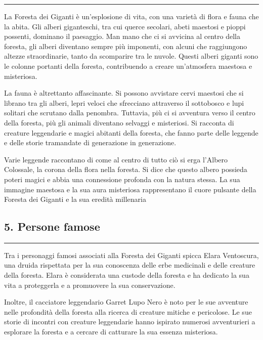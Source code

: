 \begin{center}\rule{0.5\linewidth}{0.5pt}\end{center}

La Foresta dei Giganti è un'esplosione di vita, con una varietà di flora
e fauna che la abita. Gli alberi giganteschi, tra cui querce secolari,
abeti maestosi e pioppi possenti, dominano il paesaggio. Man mano che ci
si avvicina al centro della foresta, gli alberi diventano sempre più
imponenti, con alcuni che raggiungono altezze straordinarie, tanto da
scomparire tra le nuvole. Questi alberi giganti sono le colonne portanti
della foresta, contribuendo a creare un'atmosfera maestosa e misteriosa.

La fauna è altrettanto affascinante. Si possono avvistare cervi maestosi
che si librano tra gli alberi, lepri veloci che sfrecciano attraverso il
sottobosco e lupi solitari che scrutano dalla penombra. Tuttavia, più ci
si avventura verso il centro della foresta, più gli animali diventano
selvaggi e misteriosi. Si racconta di creature leggendarie e magici
abitanti della foresta, che fanno parte delle leggende e delle storie
tramandate di generazione in generazione.

Varie leggende raccontano di come al centro di tutto ciò si erga
l'Albero Colossale, la corona della flora nella foresta. Si dice che
questo albero possieda poteri magici e abbia una connessione profonda
con la natura stessa. La sua immagine maestosa e la sua aura misteriosa
rappresentano il cuore pulsante della Foresta dei Giganti e la sua
eredità millenaria

\subsection{5. Persone famose}\label{persone-famose}

\begin{center}\rule{0.5\linewidth}{0.5pt}\end{center}

Tra i personaggi famosi associati alla Foresta dei Giganti spicca Elara
Ventoscura, una druida rispettata per la sua conoscenza delle erbe
medicinali e delle creature della foresta. Elara è considerata una
custode della foresta e ha dedicato la sua vita a proteggerla e a
promuovere la sua conservazione.

Inoltre, il cacciatore leggendario Garret Lupo Nero è noto per le sue
avventure nelle profondità della foresta alla ricerca di creature
mitiche e pericolose. Le sue storie di incontri con creature leggendarie
hanno ispirato numerosi avventurieri a esplorare la foresta e a cercare
di catturare la sua essenza misteriosa.


